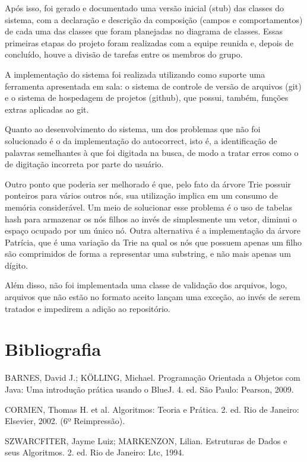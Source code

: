 \documentclass[12pt]{article}
\begin{document}
Após isso, foi gerado e documentado uma versão inicial (stub) das classes do sistema, com a declaração e descrição da composição (campos e comportamentos) de cada uma das  classes que foram planejadas no diagrama de classes. Essas primeiras etapas do projeto foram realizadas com a equipe reunida e, depois de concluído, houve a divisão de tarefas entre os membros do grupo.

A implementação do sistema foi realizada utilizando como suporte uma ferramenta apresentada em sala: o sistema de controle de versão de arquivos (git) e o sistema de hospedagem de projetos (github), que possui, também, funções extras aplicadas ao git.

Quanto ao desenvolvimento do sistema, um dos problemas que não foi solucionado é o da implementação do autocorrect, isto é, a identificação de palavras semelhantes à que foi digitada na busca, de modo a tratar erros como o de digitação incorreta por parte do usuário.

Outro ponto que poderia ser melhorado é que, pelo fato da árvore Trie possuir ponteiros para vários outros nós, sua utilização implica em um consumo de memória considerável. Um meio de solucionar esse problema é o uso de tabelas hash para armazenar os nós filhos ao invés de simplesmente um vetor, diminui o espaço ocupado por um único nó. Outra alternativa é a implementação da árvore Patrícia, que é uma variação da Trie na qual os nós que possuem apenas um filho são comprimidos de forma a representar uma substring, e não mais apenas um dígito.

Além disso, não foi implementada uma classe de validação dos arquivos, logo, arquivos
que não estão no formato aceito lançam uma exceção, ao invés de serem tratados e impedirem a adição ao repositório. 

\section{Bibliografia}

\setlength{\parindent}{0cm}
BARNES, David J.; KÖLLING, Michael. Programação Orientada a Objetos com Java: Uma introdução prática usando o BlueJ. 4. ed. São Paulo: Pearson, 2009.

CORMEN, Thomas H. et al. Algoritmos: Teoria e Prática. 2. ed. Rio de Janeiro: Elsevier, 2002. (6º Reimpressão).

SZWARCFITER, Jayme Luiz; MARKENZON, Lilian. Estruturas de Dados e seus Algoritmos. 2. ed. Rio de Janeiro: Ltc, 1994.
\end{document}
